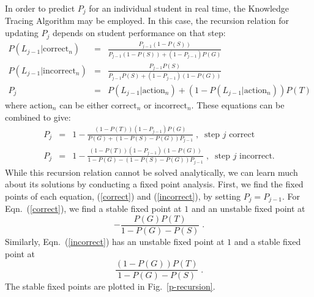\documentclass{acmlarge-edm}
\begin{document}
In order to predict $P_j$ for an individual student in real time,
the Knowledge Tracing Algorithm may be employed.  In this case, 
the recursion relation for updating $P_j$ 
\cite{corbett_knowledge_1994,baker_more_2008} depends on
student performance on that step:
\begin{eqnarray}
       P\left(L_{j-1}|\mbox{correct}_n\right) &=&
       \frac{P_{j-1}\left(1-P(S)\right)}{P_{j-1}\left(1-P(S)\right)+
                                       \left(1-P_{j-1}\right)P(G)} \\
        P\left(L_{j-1}|\mbox{incorrect}_n\right) &=& 
              \frac{P_{j-1} P(S)}
              {P_{j-1} P(S)+ \left(1-P_{j-1}\right)\left(1-P(G)\right)}
                        \\
       P_j &=& P\left(L_{j-1}|\mbox{action}_n\right)+
               \left(1-P\left(L_{j-1}|\mbox{action}_n\right)\right) P(T)
\end{eqnarray}
%
where $\mbox{action}_n$ can be either $\mbox{correct}_n$ or 
$\mbox{incorrect}_n$.  These equations can be combined to give:
%
\begin{eqnarray}
       P_j &=&
       1-\frac{\left(1-P(T)\right)\left(1-P_{j-1}\right)P(G)}{P(G)+\left(1-P(S)-P(G)\right)
         P_{j-1}}  \;,\;\; \mbox{step $j$ correct} \label{correct}\\
       P_j &=& 1-\frac{\left(1-P(T)\right)\left(1-P_{j-1}\right)\left(1-P(G)\right)}
                                 {1-P(G)-\left(1-P(S)-P(G)\right) P_{j-1}}
                        \; ,\;\; \mbox{step $j$ incorrect.} \label{incorrect}
\end{eqnarray}
%
While this recursion relation cannot be solved analytically, we
can learn much about its solutions by conducting a fixed point analysis.
First, we find the fixed points of each equation, (\ref{correct}) and
(\ref{incorrect}), by setting $P_j=P_{j-1}$.  For Eqn.~(\ref{correct}), we
find a stable fixed point at $1$ and an unstable fixed point at
\begin{equation}
    - \frac{P(G) P(T)}{1-P(G)-P(S)} \; .
      \label{correctfixedpoint}
\end{equation}
Similarly, Eqn.~(\ref{incorrect}) has an unstable fixed point at $1$
and a stable fixed point at
\begin{equation}
    \frac{\left(1-P(G)\right) P(T)}{1-P(G)-P(S)} \; . 
       \label{incorrectfixedpoint}
\end{equation}
The stable fixed points are plotted in Fig.~\ref{p-recursion}.
\end{document}
